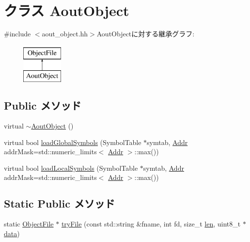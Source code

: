 \hypertarget{classAoutObject}{
\section{クラス AoutObject}
\label{classAoutObject}
}


{\ttfamily \#include $<$aout\_\-object.hh$>$}AoutObjectに対する継承グラフ:\begin{figure}[H]
\begin{center}
\leavevmode
\includegraphics[height=2cm]{classAoutObject}
\end{center}
\end{figure}
\subsection*{Public メソッド}
\begin{DoxyCompactItemize}
\item 
virtual \hyperlink{classAoutObject_a7062369914ccdd09ee239a41c0d42c9a}{$\sim$AoutObject} ()
\item 
virtual bool \hyperlink{classAoutObject_a1de102f86bbb53d20455d9e78be53935}{loadGlobalSymbols} (SymbolTable $\ast$symtab, \hyperlink{base_2types_8hh_af1bb03d6a4ee096394a6749f0a169232}{Addr} addrMask=std::numeric\_\-limits$<$ \hyperlink{base_2types_8hh_af1bb03d6a4ee096394a6749f0a169232}{Addr} $>$::max())
\item 
virtual bool \hyperlink{classAoutObject_aab9393b89c15838ac1b842e642f981bb}{loadLocalSymbols} (SymbolTable $\ast$symtab, \hyperlink{base_2types_8hh_af1bb03d6a4ee096394a6749f0a169232}{Addr} addrMask=std::numeric\_\-limits$<$ \hyperlink{base_2types_8hh_af1bb03d6a4ee096394a6749f0a169232}{Addr} $>$::max())
\end{DoxyCompactItemize}
\subsection*{Static Public メソッド}
\begin{DoxyCompactItemize}
\item 
static \hyperlink{classObjectFile}{ObjectFile} $\ast$ \hyperlink{classAoutObject_af96c4ced69d653731f78ba9d9006e251}{tryFile} (const std::string \&fname, int fd, size\_\-t \hyperlink{classObjectFile_a7360b55975153b822efc5217b7734e6a}{len}, uint8\_\-t $\ast$\hyperlink{classObjectFile_abbae3bd152e2d64768026e03593e64f3}{data})
\end{DoxyCompactItemize}
